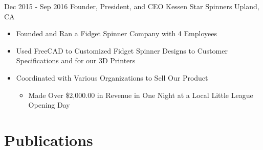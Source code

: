 \documentclass[11pt]{moderncv}
\begin{document}
\cventry
{Dec 2015 - Sep 2016}
{Founder, President, and CEO}
{Kessen Star Spinners}
{Upland, CA}
{}
{%
\begin{itemize}
\item Founded and Ran a Fidget Spinner Company with 4 Employees
\item Used FreeCAD to Customized Fidget Spinner Designs to Customer Specifications and for our 3D Printers
\item Coordinated with Various Organizations to Sell Our Product
  \begin{itemize}
  \item Made Over \$2,000.00 in Revenue in One Night at a Local Little League Opening Day
  \end{itemize}
\end{itemize}
}
\section{Publications}
\makeatletter
\renewenvironment{thebibliography}[1]
{%
\list{\@biblabel{\@arabic\c@enumiv}}{%
\settowidth\labelwidth{\@biblabel{\@arabic\c@enumiv}}%
\leftmargin\labelwidth
\advance\leftmargin\labelsep
\usecounter{enumiv}%
\let\p@enumiv\@empty
\renewcommand\theenumiv{\@arabic\c@enumiv}%
}%
\sloppy\clubpenalty4000\widowpenalty4000
\sfcode`\.=\@m
}
{%
\def\@noitemerr{\@latex@warning{Empty `thebibliography' environment}}%
\endlist
}
\makeatother
\nocite{goetz2025mbkg, translator2025, qin2024multiomics}


\end{document}
